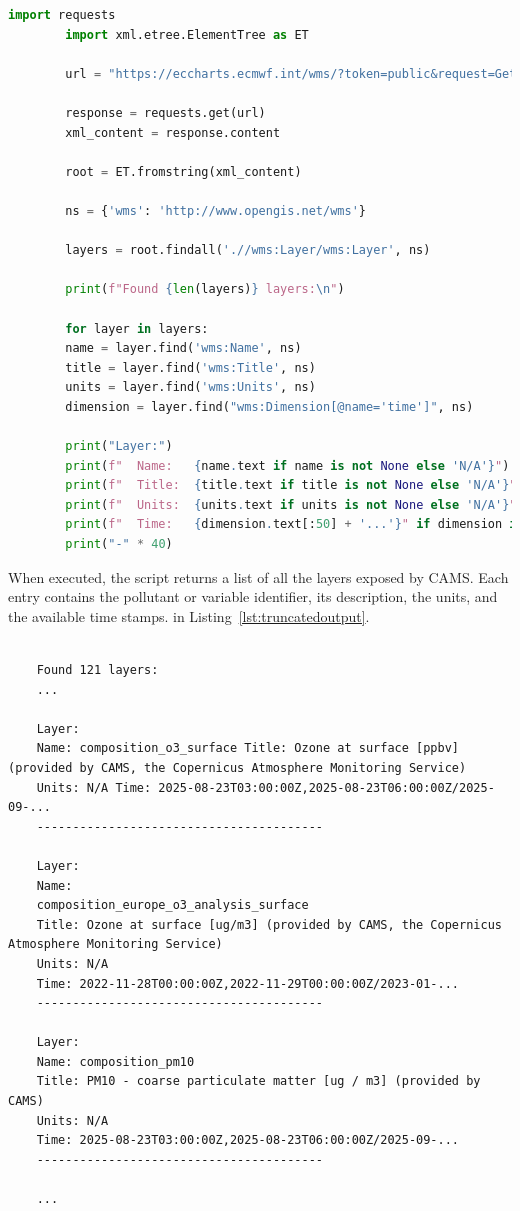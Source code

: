  \begin{lstlisting}[language=Python, caption={Python script to extract CAMS layers from WMS GetCapabilities}, label={lst:getcapabilities}]
		import requests
		import xml.etree.ElementTree as ET
		
		url = "https://eccharts.ecmwf.int/wms/?token=public&request=GetCapabilities&version=1.3.0"
		
		response = requests.get(url)
		xml_content = response.content
		
		root = ET.fromstring(xml_content)
		
		ns = {'wms': 'http://www.opengis.net/wms'}
		
		layers = root.findall('.//wms:Layer/wms:Layer', ns)
		
		print(f"Found {len(layers)} layers:\n")
		
		for layer in layers:
		name = layer.find('wms:Name', ns)
		title = layer.find('wms:Title', ns)
		units = layer.find('wms:Units', ns)
		dimension = layer.find("wms:Dimension[@name='time']", ns)
		
		print("Layer:")
		print(f"  Name:   {name.text if name is not None else 'N/A'}")
		print(f"  Title:  {title.text if title is not None else 'N/A'}")
		print(f"  Units:  {units.text if units is not None else 'N/A'}")
		print(f"  Time:   {dimension.text[:50] + '...'}" if dimension is not None else "  Time:   N/A")
		print("-" * 40)
\end{lstlisting}

When executed, the script returns a list of all the layers exposed by CAMS. Each entry contains the pollutant or variable identifier, its description, the units, and the available time stamps. in Listing~\ref{lst:truncatedoutput}.

\begin{lstlisting}[caption={Truncated output of the GetCapabilities request}, label={lst:truncatedoutput}]

	Found 121 layers:
	...
	
	Layer: 
	Name: composition_o3_surface Title: Ozone at surface [ppbv] (provided by CAMS, the Copernicus Atmosphere Monitoring Service)
	Units: N/A Time: 2025-08-23T03:00:00Z,2025-08-23T06:00:00Z/2025-09-... 
	---------------------------------------- 
	
	Layer: 
	Name: 
	composition_europe_o3_analysis_surface 
	Title: Ozone at surface [ug/m3] (provided by CAMS, the Copernicus Atmosphere Monitoring Service) 
	Units: N/A 
	Time: 2022-11-28T00:00:00Z,2022-11-29T00:00:00Z/2023-01-... 
	---------------------------------------- 
	
	Layer: 
	Name: composition_pm10 
	Title: PM10 - coarse particulate matter [ug / m3] (provided by CAMS) 
	Units: N/A 
	Time: 2025-08-23T03:00:00Z,2025-08-23T06:00:00Z/2025-09-... 
	----------------------------------------
	
	...
\end{lstlisting}

